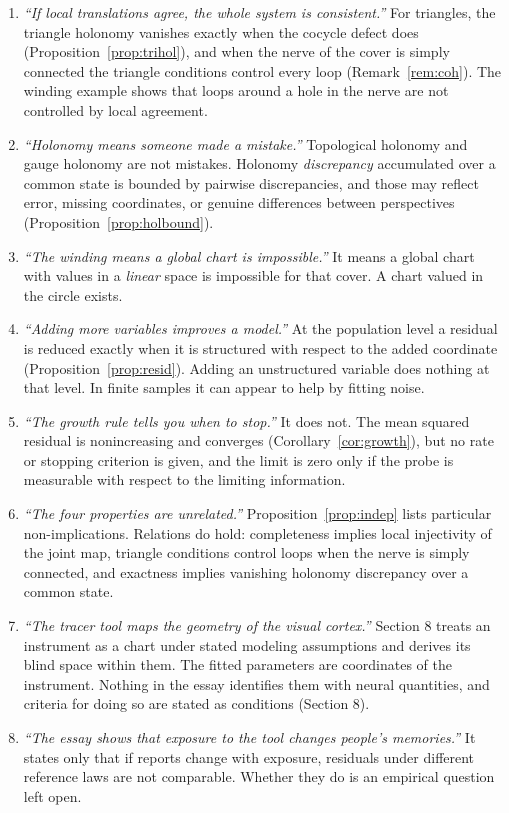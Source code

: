 \documentclass[11pt]{article}
\theoremstyle{remark}
\begin{document}
\begin{enumerate}[label=\textbf{M\arabic*.},leftmargin=2.2em,itemsep=4pt]
\item \emph{``If local translations agree, the whole system is consistent.''} For triangles, the triangle holonomy vanishes exactly when the cocycle defect does (Proposition~\ref{prop:trihol}), and when the nerve of the cover is simply connected the triangle conditions control every loop (Remark~\ref{rem:coh}). The winding example shows that loops around a hole in the nerve are not controlled by local agreement.
\item \emph{``Holonomy means someone made a mistake.''} Topological holonomy and gauge holonomy are not mistakes. Holonomy \emph{discrepancy} accumulated over a common state is bounded by pairwise discrepancies, and those may reflect error, missing coordinates, or genuine differences between perspectives (Proposition~\ref{prop:holbound}).
\item \emph{``The winding means a global chart is impossible.''} It means a global chart with values in a \emph{linear} space is impossible for that cover. A chart valued in the circle exists.
\item \emph{``Adding more variables improves a model.''} At the population level a residual is reduced exactly when it is structured with respect to the added coordinate (Proposition~\ref{prop:resid}). Adding an unstructured variable does nothing at that level. In finite samples it can appear to help by fitting noise.
\item \emph{``The growth rule tells you when to stop.''} It does not. The mean squared residual is nonincreasing and converges (Corollary~\ref{cor:growth}), but no rate or stopping criterion is given, and the limit is zero only if the probe is measurable with respect to the limiting information.
\item \emph{``The four properties are unrelated.''} Proposition~\ref{prop:indep} lists particular non-implications. Relations do hold: completeness implies local injectivity of the joint map, triangle conditions control loops when the nerve is simply connected, and exactness implies vanishing holonomy discrepancy over a common state.
\item \emph{``The tracer tool maps the geometry of the visual cortex.''} Section 8 treats an instrument as a chart under stated modeling assumptions and derives its blind space within them. The fitted parameters are coordinates of the instrument. Nothing in the essay identifies them with neural quantities, and criteria for doing so are stated as conditions (Section 8).
\item \emph{``The essay shows that exposure to the tool changes people's memories.''} It states only that if reports change with exposure, residuals under different reference laws are not comparable. Whether they do is an empirical question left open.

\end{enumerate}
\end{document}
